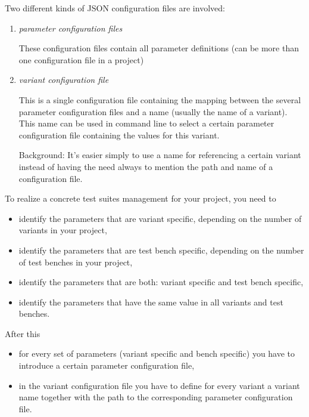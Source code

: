 Two different kinds of JSON configuration files are involved:

\begin{enumerate}
   \item \emph{parameter configuration files}

   These configuration files contain all parameter definitions (can be more than one configuration file in a project)

   \item \emph{variant configuration file}

   This is a single configuration file containing the mapping between the several parameter configuration files and a name
   (usually the name of a variant). This name can be used in command line to select a certain parameter configuration file
   containing the values for this variant.

   Background: It's easier simply to use a name for referencing a certain variant instead of having the need always to mention
   the path and name of a configuration file.
\end{enumerate}

To realize a concrete test suites management for your project, you need to

\begin{itemize}
   \item identify the parameters that are variant specific, depending on the number of variants in your project,
   \item identify the parameters that are test bench specific, depending on the number of test benches in your project,
   \item identify the parameters that are both: variant specific and test bench specific,
   \item identify the parameters that have the same value in all variants and test benches.
\end{itemize}

After this

\begin{itemize}
   \item for every set of parameters (variant specific and bench specific) you have to introduce a certain parameter configuration file,
   \item in the variant configuration file you have to define for every variant a variant name together
         with the path to the corresponding parameter configuration file.
\end{itemize}

